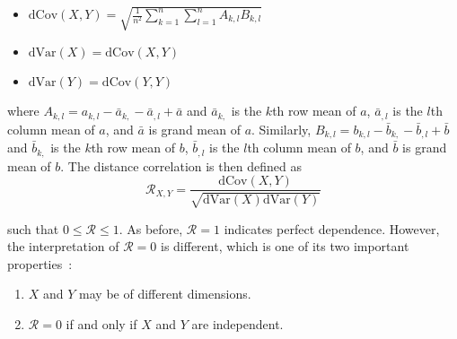\tablespacing
\begin{itemize}
	\item $\mathrm{dCov}(X,Y) = \sqrt{\frac{1}{n^2} \sum\limits_{k=1}^{n} 
	\sum\limits_{l=1}^{n} A_{k,l} B_{k,l}}$
	\item $\mathrm{dVar}(X) = \mathrm{dCov}(X,Y)$
	\item $\mathrm{dVar}(Y) = \mathrm{dCov}(Y,Y)$
\end{itemize}
\bodyspacing

\noindent where $A_{k,l}=a_{k,l}-\bar{a}_{k,}-\bar{a}_{,l}+\bar{a}$ and 
$\bar{a}_{k,}$ is the $k$th row mean of $a$, $\bar{a}_{,l}$ is the $l$th column 
mean of $a$, and $\bar{a}$ is grand mean of $a$. 
Similarly, $B_{k,l}=b_{k,l}-\bar{b}_{k,}-\bar{b}_{,l}+\bar{b}$ and 
$\bar{b}_{k,}$ is the $k$th row mean of $b$, $\bar{b}_{,l}$ is the $l$th column 
mean of $b$, and $\bar{b}$ is grand mean of $b$. The distance correlation is 
then defined as
$$\mathcal{R}_{X,Y}=\frac{\mathrm{dCov}(X,Y)}
{\sqrt{\mathrm{dVar}(X)\mathrm{dVar}(Y)}}$$

\noindent such that $0 \leq \mathcal{R} \leq 1$. As before, $\mathcal{R}=1$ 
indicates perfect dependence. However, the interpretation of $\mathcal{R}=0$ is 
different, which is one of its two important properties~\cite{szekely2007}: 

\tablespacing
\begin{enumerate}
	\item $X$ and $Y$ may be of different dimensions.
	\item $\mathcal{R}=0$ if and only if $X$ and $Y$ are independent.
\end{enumerate}
\bodyspacing

